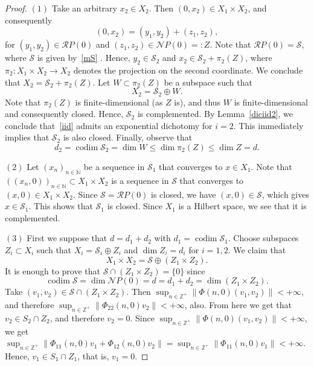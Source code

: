 \documentclass[11pt,reqno,a4paper]{amsart}
\theoremstyle{plain}
\numberwithin{equation}{section}
\theoremstyle{remark}
\DeclareMathOperator{\codim}{codim}
\def\Z{\mathbb{Z}}
\begin{document}
\begin{proof}
$(1)$ Take an arbitrary $x_2\in X_2$. Then $(0, x_2)\in X_1\times X_2$, and consequently
\[
(0, x_2)=(y_1, y_2)+(z_1, z_2),
\]
for $(y_1, y_2)\in \mathcal R P(0)$ and $(z_1, z_2)\in \mathcal NP(0)=:Z$. Note that $\mathcal RP(0)=\mathcal S$, where $\mathcal S$ is given by~\eqref{mS} .
Hence, $y_2\in \mathcal S_2$ and $x_2\in \mathcal S_2+\pi_2 (Z)$, where $\pi_2\colon X_1\times X_2 \to X_2$ denotes the projection on the second coordinate. We conclude that $X_2=\mathcal S_2+\pi_2(Z)$. Let $W\subset \pi_2(Z)$ be a subspace such that \[X_2=\mathcal S_2\oplus W.\] Note that $\pi_2(Z)$ is finite-dimensional (as $Z$ is), and thus $W$ is finite-dimensional and consequently closed. Hence, $\mathcal S_2$ is complemented. By Lemma~\ref{diciid2}, we conclude that~\eqref{iid} admits an exponential dichotomy for $i=2$. This immediately implies that $\mathcal S_2$ is also closed. Finally, observe that 
\[d_2=\codim \mathcal S_2=\dim W\le \dim \pi_2(Z) \le \dim Z=d.\]


$(2)$ Let $(x_n)_{n\in \mathbb N}$ be a sequence in $\mathcal S_1$ that converges to $x\in X_1$. Note that $((x_n, 0))_{n\in \mathbb N}\subset X_1\times X_2$ is a sequence in $\mathcal S$ that converges to $(x, 0)\in X_1\times X_2$. Since $\mathcal S=\mathcal RP(0)$ is closed, we have $(x, 0)\in \mathcal S$, which gives $x\in \mathcal S_1$. This shows that $\mathcal S_1$ is closed. Since $X_1$ is a Hilbert space, we see that it is complemented.

$(3)$ First we suppose that $d=d_1+d_2$ with $d_1=\codim \mathcal S_1$. Choose subspaces $Z_i\subset X_i$ such that $X_i=\mathcal S_i\oplus Z_i$ and $\dim Z_i=d_i$ for $i=1, 2$. We claim that
\[
X_1\times X_2=\mathcal S \oplus (Z_1\times Z_2).
\]
It is enough to prove that $\mathcal S \cap (Z_1 \times Z_2) = \{0\}$ since \[\codim \mathcal S=\dim \mathcal NP(0)=d=d_1+d_2=\dim (Z_1\times Z_2).\]
Take $(v_1,v_2) \in \mathcal S \cap (Z_1 \times Z_2)$. Then $\sup_{n \in \Z^+} \|\Phi(n,0)(v_1,v_2)\| < + \infty$, and therefore $\sup_{n \in \Z^+} \|\Phi_{22}(n,0)v_2\| < + \infty$, also. From here we get that $v_2 \in S_2 \cap Z_2$, and therefore $v_2=0$. Since $\sup_{n \in \Z^+} \|\Phi(n,0)(v_1, v_2)\| < + \infty$, we get $\sup_{n \in \Z^+} \|\Phi_{11}(n,0)v_1 + \Phi_{12}(n,0)v_2\|=\sup_{n \in \Z^+} \|\Phi_{11}(n,0)v_1\| < + \infty$. Hence, $v_1 \in S_1 \cap Z_1$, that is, $v_1=0$.%


\end{proof}
\end{document}
